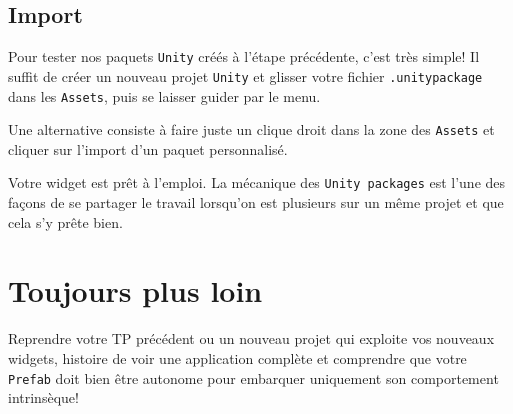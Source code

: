 \documentclass[a4paper,10pt]{article}
\newenvironment{info}%
{\begin{tcolorbox}[breakable,colback=green!5!white,colframe=green!75!black,title=Information]}%
{\end{tcolorbox}}
\begin{document}
\subsection{Import}

Pour tester nos paquets \texttt{Unity} créés à l'étape précédente, c'est très simple! Il suffit de créer un nouveau projet \texttt{Unity} et glisser votre fichier \texttt{.unitypackage} dans les \texttt{Assets}, puis se laisser guider par le menu.

\begin{info}
Une alternative consiste  à faire juste un clique droit dans la zone des \texttt{Assets} et cliquer sur l'import d'un paquet personnalisé.
\end{info}

Votre widget est prêt à l'emploi. La mécanique des \texttt{Unity packages} est l'une des façons de se partager le travail lorsqu'on est plusieurs sur un même projet et que cela s'y prête bien. 

\section{Toujours plus loin}

Reprendre votre TP précédent ou un nouveau projet qui exploite vos nouveaux widgets, histoire de voir une application complète et comprendre que votre \texttt{Prefab} doit bien être autonome pour embarquer uniquement son comportement intrinsèque!
\end{document}
